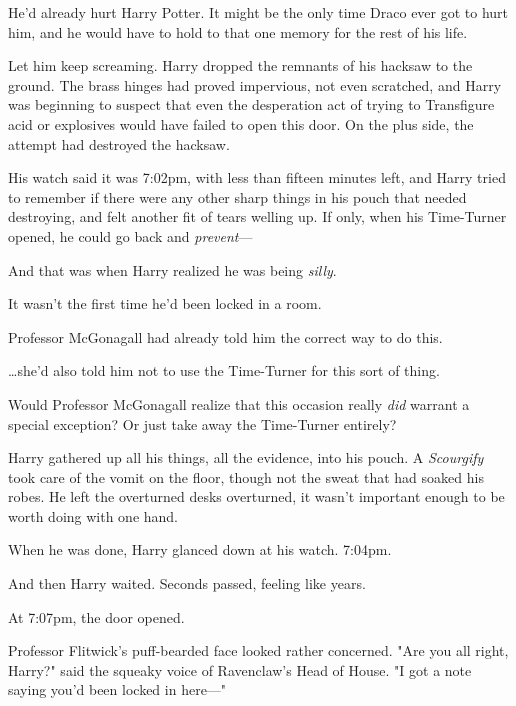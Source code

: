 He'd already hurt Harry Potter. It might be the only time Draco ever got to
hurt him, and he would have to hold to that one memory for the rest of his life.

Let him keep screaming.
\later
Harry dropped the remnants of his hacksaw to the ground. The brass hinges had
proved impervious, not even scratched, and Harry was beginning to suspect that
even the desperation act of trying to Transfigure acid or explosives would have
failed to open this door. On the plus side, the attempt had destroyed the
hacksaw.

His watch said it was 7:02pm, with less than fifteen minutes left, and Harry
tried to remember if there were any other sharp things in his pouch that needed
destroying, and felt another fit of tears welling up. If only, when his
Time-Turner opened, he could go back and \emph{prevent}---

And that was when Harry realized he was being \emph{silly}.

It wasn't the first time he'd been locked in a room.

Professor McGonagall had already told him the correct way to do this.

…she'd also told him not to use the Time-Turner for this sort of thing.

Would Professor McGonagall realize that this occasion really \emph{did} warrant
a special exception? Or just take away the Time-Turner entirely?

Harry gathered up all his things, all the evidence, into his pouch. A
\emph{Scourgify} took care of the vomit on the floor, though not the sweat that
had soaked his robes. He left the overturned desks overturned, it wasn't
important enough to be worth doing with one hand.

When he was done, Harry glanced down at his watch. 7:04pm.

And then Harry waited. Seconds passed, feeling like years.

At 7:07pm, the door opened.

Professor Flitwick's puff-bearded face looked rather concerned. "Are you all
right, Harry?" said the squeaky voice of Ravenclaw's Head of House. "I got a
note saying you'd been locked in here---"
